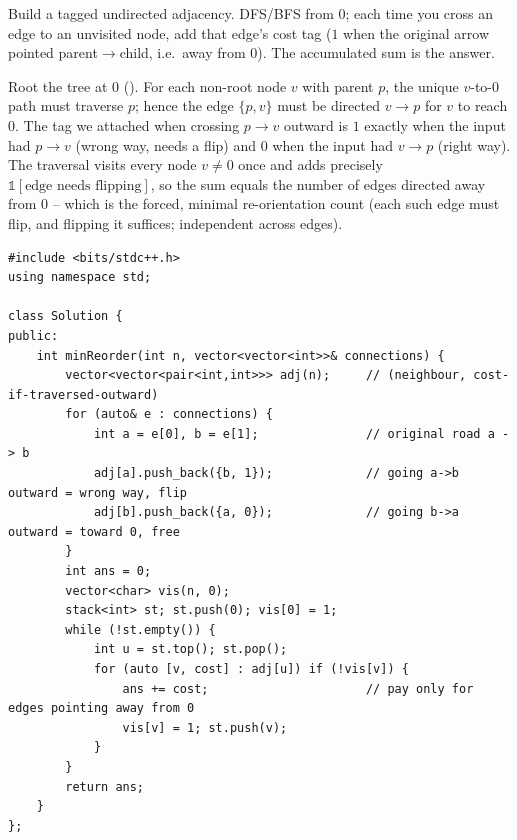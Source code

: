 \begin{thinkbox}
\end{thinkbox}

Build a tagged undirected adjacency. DFS/BFS from $0$; each time you cross an edge to an
unvisited node, add that edge's cost tag ($1$ when the original arrow pointed
parent$\to$child, i.e.\ away from $0$). The accumulated sum is the answer.

\begin{proofbox}
Root the tree at $0$ (). For each non-root node $v$ with parent $p$,
the unique $v$-to-$0$ path must traverse $p$; hence the edge $\{p,v\}$ must be directed
$v \to p$ for $v$ to reach $0$. The tag we attached when crossing $p\to v$ outward is $1$
exactly when the input had $p \to v$ (wrong way, needs a flip) and $0$ when the input had
$v \to p$ (right way). The traversal visits every node $v\neq0$ once and adds precisely
$\mathbb{1}[\text{edge needs flipping}]$, so the sum equals the number of edges directed
away from $0$ -- which is the forced, minimal re-orientation count (each such edge must
flip, and flipping it suffices; independent across edges).
\end{proofbox}

\begin{lstlisting}[caption={Reorder Routes to City Zero (LeetCode 1466)}, label={lst:c04-reorder-routes}]
#include <bits/stdc++.h>
using namespace std;

class Solution {
public:
    int minReorder(int n, vector<vector<int>>& connections) {
        vector<vector<pair<int,int>>> adj(n);     // (neighbour, cost-if-traversed-outward)
        for (auto& e : connections) {
            int a = e[0], b = e[1];               // original road a -> b
            adj[a].push_back({b, 1});             // going a->b outward = wrong way, flip
            adj[b].push_back({a, 0});             // going b->a outward = toward 0, free
        }
        int ans = 0;
        vector<char> vis(n, 0);
        stack<int> st; st.push(0); vis[0] = 1;
        while (!st.empty()) {
            int u = st.top(); st.pop();
            for (auto [v, cost] : adj[u]) if (!vis[v]) {
                ans += cost;                      // pay only for edges pointing away from 0
                vis[v] = 1; st.push(v);
            }
        }
        return ans;
    }
};
\end{lstlisting}

